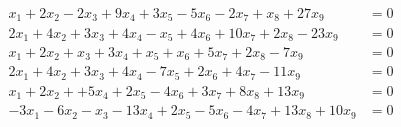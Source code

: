 \begin{align*}
x_1 +2x_ 2-2x_3 +9x_4 +3x_5 -5x_6-2x_7 +x_8 +27x_9 &= 0 \\ 
2x_1 +4x_2 +3x_3 +4x_4 -x_5 +4x_6 +10x_7 +2x_8 -23x_9 &=0 \\ 
x_1 +2x_2 +x_3 + 3x_4 +x_5 +x_6 +5x_7 +2x_8 -7x_9 &=0 \\ 
2x_1 +4x_2 +3x_3 + 4x_4 -7x_5 +2x_6 +4x_7 -11x_ 9&=0 \\ 
x_1 +2x_2 + + 5x_4 +2x_5 -4x_6 +3x_7 +8x_8 +13x_9 &= 0\\ 
-3x_1 -6x_2 -x_3 -13x_4 +2x_5 -5x_6 -4x_7 +13x_ 8+10x_ 9&=0
\end{align*}